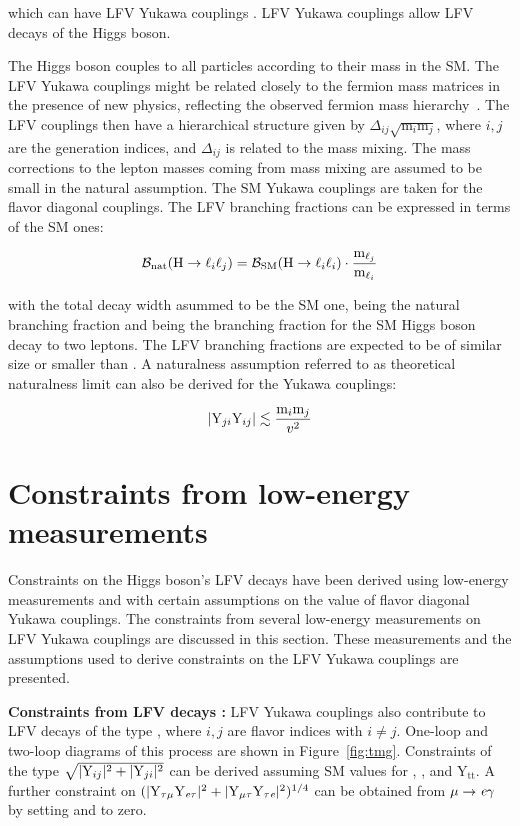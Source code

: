 which can have LFV Yukawa couplings \Yij. LFV Yukawa couplings allow LFV decays of the Higgs boson.

The Higgs boson couples to all particles according to their mass in the SM. The LFV Yukawa couplings might be related closely to the fermion mass matrices in the presence of new physics, reflecting the observed fermion mass hierarchy~\cite{Cheng:1987rs}. The LFV couplings then have a hierarchical structure given by $\Delta_{ij} \sqrt{\text{m}_{i} \text{m}_{j}}$, where $i, j$ are the generation indices, and $\Delta_{ij}$ is related to the mass mixing. The mass corrections to the lepton masses coming from mass mixing are assumed to be small in the natural assumption. The SM Yukawa couplings are taken for the flavor diagonal couplings. The LFV branching fractions can be expressed in terms of the SM ones:

\begin{equation}
  \mathcal{B}_{\text{nat}}(\text{H} \to \ell_{i} \ell_{j}) = \mathcal{B}_{\text{SM}}(\text{H} \to \ell_{i} \ell_{i}) \cdot \frac{\text{m}_{\ell_{j}}}{\text{m}_{\ell_{i}}}
\end{equation}

with the total decay width asummed to be the SM one, \BHij being the natural branching fraction and \BHsm being the branching fraction for the SM Higgs boson decay to two leptons. The LFV branching fractions are expected to be of similar size or smaller than \BHij. A naturalness assumption referred to as theoretical naturalness limit can also be derived for the Yukawa couplings:

\begin{equation}
  |\text{Y}_{ji} \text{Y}_{ij}| \lesssim \frac{\text{m}_{i} \text{m}_{j}}{v^2}
\end{equation}


\section{Constraints from low-energy measurements}

Constraints on the Higgs boson's LFV decays have been derived using low-energy measurements and with certain assumptions on the value of flavor diagonal Yukawa couplings. The constraints from several low-energy measurements on LFV Yukawa couplings are discussed in this section. These measurements and the assumptions used to derive constraints on the LFV Yukawa couplings are presented.

\textbf{Constraints from LFV decays \liljg:} LFV Yukawa couplings also contribute to LFV decays of the type \liljg, where $i, j$ are flavor indices with $i \neq j$. One-loop and two-loop diagrams of this process are shown in Figure~\ref{fig:tmg}. Constraints of the type $\sqrt{|\text{Y}_{ij}|^2+|\text{Y}_{ji}|^2}$ can be derived assuming SM values for \Ytt, \Ymm, and $\text{Y}_{\text{tt}}$. A further constraint on $(|\text{Y}_{\tau\mu} \text{Y}_{\textit{e}\tau}|^2 + |\text{Y}_{\mu\tau} \text{Y}_{\tau\textit{e}}|^2)^{1/4}$ can be obtained from $\mu \to \textit{e} \gamma$ by setting \Yme and \Yem to zero.

